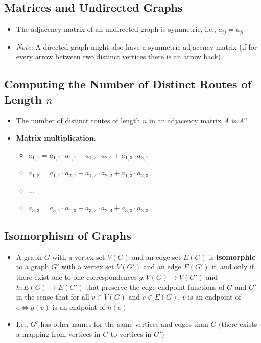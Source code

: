 \subsection{Matrices and Undirected Graphs}
\begin{itemize}
  \item The adjacency matrix of an undirected graph is symmetric, i.e., $a_{ij} = a_{ji}$
  \item \textit{Note:} A directed graph might also have a symmetric adjacency matrix (if for every arrow between two distinct vertices there is an arrow back).
\end{itemize}

\subsection{Computing the Number of Distinct Routes of Length \texorpdfstring{$n$}{n}}
\begin{itemize}
  \item The number of distinct routes of length $n$ in an adjacency matrix $A$ is $A^{n}$
  \item \textbf{Matrix multiplication}:
  \begin{itemize}
    \item $a_{1,1} = a_{1,1} \cdot a_{1,1} + a_{1,2} \cdot a_{2,1} + a_{1,3} \cdot a_{3,1}$
    \item $a_{1,2} = a_{1,1} \cdot a_{2,1} + a_{1,2} \cdot a_{2,2} + a_{1,3} \cdot a_{2,3}$
    \item $\dots$
    \item $a_{3,3} = a_{3,1} \cdot a_{1,3} + a_{3,2} \cdot a_{2,3} + a_{3,3} \cdot a_{3,3}$
  \end{itemize}
\end{itemize}

\subsection{Isomorphism of Graphs}
\begin{itemize}
  \item A graph $G$ with a vertex set $V(G)$ and an edge set $E(G)$ is \textbf{isomorphic} to a graph $G'$ with a vertex set $V(G')$ and an edge $E(G')$ if, and only if, there exist one-to-one correspondences $g: V(G) \rightarrow V(G')$ and $h: E(G) \rightarrow E(G')$ that preserve the edge-endpoint functions of $G$ and $G'$ in the sense that for all $v \in V(G)$ and $e \in E(G)$, $v$ is an endpoint of $e \Leftrightarrow g(v)$ is an endpoint of $h(e)$
  \item I.e., $G'$ has other names for the same vertices and edges than $G$ (there exists a mapping from vertices in $G$ to vertices in $G'$)
\end{itemize}

